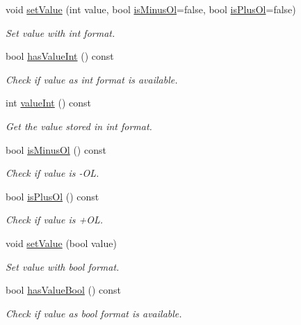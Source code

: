 \begin{DoxyCompactItemize}
void \hyperlink{classmdt_value_ae4a84a502223cfd47538474dee897ad0}{set\-Value} (int value, bool \hyperlink{classmdt_value_a4de0d0c8a02cdd4c02adace4108db326}{is\-Minus\-Ol}=false, bool \hyperlink{classmdt_value_a033ad1d20812dddf38530a5f190033da}{is\-Plus\-Ol}=false)
\begin{DoxyCompactList}\small\item\em Set value with int format. \end{DoxyCompactList}\item 
bool \hyperlink{classmdt_value_a4aeeb92ec5b1f0a625cbd2d944ae761b}{has\-Value\-Int} () const 
\begin{DoxyCompactList}\small\item\em Check if value as int format is available. \end{DoxyCompactList}\item 
int \hyperlink{classmdt_value_a421b294b1540ce7c47aada2ea66201a1}{value\-Int} () const 
\begin{DoxyCompactList}\small\item\em Get the value stored in int format. \end{DoxyCompactList}\item 
bool \hyperlink{classmdt_value_a4de0d0c8a02cdd4c02adace4108db326}{is\-Minus\-Ol} () const 
\begin{DoxyCompactList}\small\item\em Check if value is -\/\-O\-L. \end{DoxyCompactList}\item 
bool \hyperlink{classmdt_value_a033ad1d20812dddf38530a5f190033da}{is\-Plus\-Ol} () const 
\begin{DoxyCompactList}\small\item\em Check if value is +\-O\-L. \end{DoxyCompactList}\item 
void \hyperlink{classmdt_value_ab526b9b9d04b641394b1679336b59c32}{set\-Value} (bool value)
\begin{DoxyCompactList}\small\item\em Set value with bool format. \end{DoxyCompactList}\item 
bool \hyperlink{classmdt_value_a8ec9abcaa40b5ec891ff740913f1aca8}{has\-Value\-Bool} () const 
\begin{DoxyCompactList}\small\item\em Check if value as bool format is available. \end{DoxyCompactList}\item 

\end{DoxyCompactItemize}
